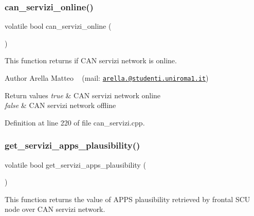 \subsubsection{\texorpdfstring{can\+\_\+servizi\+\_\+online()}{can\_servizi\_online()}}
{\footnotesize\ttfamily volatile bool can\+\_\+servizi\+\_\+online (\begin{DoxyParamCaption}{ }\end{DoxyParamCaption})}



This function returns if C\+AN servizi network is online. 

\begin{DoxyAuthor}{Author}
Arella Matteo ~\newline
 (mail\+: \href{mailto:arella.1646983@studenti.uniroma1.it}{\tt arella.@studenti.\+uniroma1.\+it})
\end{DoxyAuthor}

\begin{DoxyRetVals}{Return values}
{\em true} & C\+AN servizi network online \\
\hline
{\em false} & C\+AN servizi network offline \\
\hline
\end{DoxyRetVals}


Definition at line 220 of file can\+\_\+servizi.\+cpp.

\mbox{\label{group___c_a_n__servizi__group_ga66135a8978149fc6fa0b62446131ce95}} 
\subsubsection{\texorpdfstring{get\+\_\+servizi\+\_\+apps\+\_\+plausibility()}{get\_servizi\_apps\_plausibility()}}
{\footnotesize\ttfamily volatile bool get\+\_\+servizi\+\_\+apps\+\_\+plausibility (\begin{DoxyParamCaption}{ }\end{DoxyParamCaption})}



This function returns the value of A\+P\+PS plausibility retrieved by frontal S\+CU node over C\+AN servizi network. 

